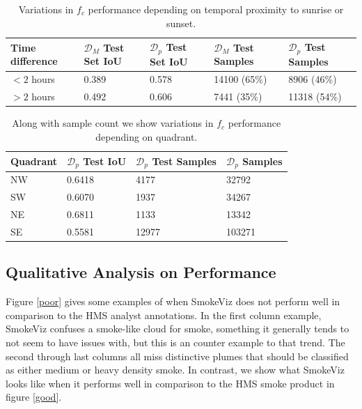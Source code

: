 \documentclass{article}
\begin{document}
\begin{table}
    \caption{Variations in \(f_c\) performance depending on temporal proximity to sunrise or sunset.}
  \label{two_hr_iou}
  \centering
  \begin{tabular}{lllll}
    \toprule
    Time difference & \(\mathcal{D}_M\) Test Set IoU & \(\mathcal{D}_p\) Test Set IoU & \(\mathcal{D}_M\) Test Samples & \(\mathcal{D}_p\) Test Samples \\ 
    \midrule
    \(<2\) hours & 0.389 & 0.578 & 14100 (65\%) & 8906 (46\%)\\
    \(>2\) hours & 0.492 & 0.606 & 7441 (35\%) &  11318 (54\%) \\
    \bottomrule
  \end{tabular}
\end{table}


\begin{table}
    \caption{Along with sample count we show variations in \(f_{c}\) performance depending on quadrant.}
  \label{quad}
  \centering
  \begin{tabular}{llll}
    \toprule
    Quadrant & \(\mathcal{D}_p\) Test IoU & \(\mathcal{D}_p\) Test Samples & \(\mathcal{D}_p\) Samples \\
    \midrule
    NW & 0.6418 & 4177 & 32792\\
    SW & 0.6070 & 1937 & 34267\\
    NE & 0.6811 & 1133   & 13342\\
    SE & 0.5581 & 12977 & 103271 \\
    \bottomrule
  \end{tabular}
\end{table}

\subsection{Qualitative Analysis on Performance}

Figure \ref{poor} gives some examples of when SmokeViz does not perform well in comparison to the HMS analyst annotations. In the first column example, SmokeViz confuses a smoke-like cloud for smoke, something it generally tends to not seem to have issues with, but this is an counter example to that trend. The second through last columns all miss distinctive plumes that should be classified as either medium or heavy density smoke. In contrast, we show what SmokeViz looks like when it performs well in comparison to the HMS smoke product in figure \ref{good}.
\end{document}
